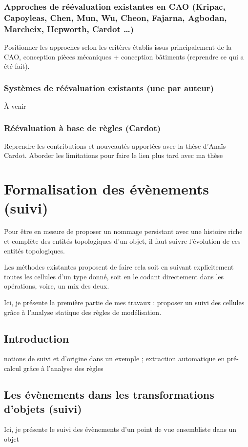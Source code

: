 \documentclass[11pt]{article}
\begin{document}
\subsubsection{Approches de réévaluation existantes en CAO (Kripac, Capoyleas, Chen, Mun, Wu, Cheon, Fajarna, Agbodan, Marcheix, Hepworth, Cardot …)}
\label{sec:org586bd5b}
Positionner les approches selon les critères établis issus principalement de la
CAO, conception pièces mécaniques + conception bâtiments (reprendre ce qui a été
fait).
\subsubsection{Systèmes de réévaluation existants (une par auteur)}
\label{sec:org97f008f}
À venir
\subsubsection{Réévaluation à base de règles (Cardot)}
\label{sec:org61bf765}
Reprendre les contributions et nouveautés apportées avec la thèse d'Anaïs Cardot.
Aborder les limitations pour faire le lien plus tard avec ma thèse

\section{Formalisation des évènements (suivi)}
\label{sec:org9f3d442}
Pour être en mesure de proposer un nommage persistant avec une histoire riche et
complète des entités topologiques d'un objet, il faut suivre l'évolution de ces
entités topologiques.

Les méthodes existantes proposent de faire cela soit en suivant
explicitement toutes les cellules d'un type donné, soit en le codant
directement dans les opérations, voire, un mix des deux.

Ici, je présente la première partie de mes travaux : proposer un suivi des cellules grâce à l'analyse statique des règles de modélisation.
\subsection{Introduction}
\label{sec:org26827c0}
notions de suivi et d'origine dans un exemple ; extraction automatique en pré-calcul grâce à l'analyse des règles
\subsection{Les évènements dans les transformations d'objets (suivi)}
\label{sec:org53f0930}
Ici, je présente le suivi des évènements d'un point de vue ensembliste dans un objet
\end{document}
